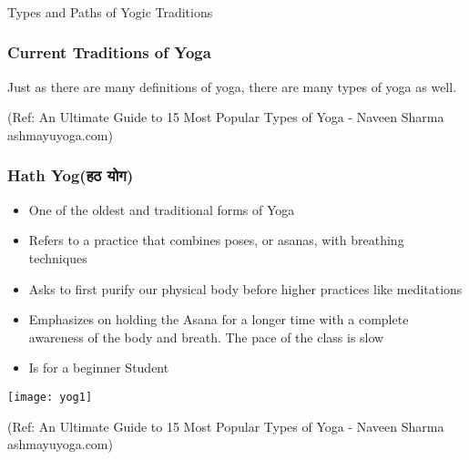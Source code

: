 \begin{frame}[fragile]\frametitle{}
\begin{center}
{\Large Types and Paths of Yogic Traditions}
\end{center}
\end{frame}


\begin{frame}[fragile]\frametitle{Current Traditions of Yoga}
Just as there are many definitions of yoga, there are many types of yoga as well. 

\tiny{(Ref: An Ultimate Guide to 15 Most Popular Types of Yoga - Naveen Sharma ashmayuyoga.com)}
\end{frame}

\begin{frame}[fragile]\frametitle{Hath Yog(हठ योग)}
	\begin{itemize}
	\item One of the oldest and traditional forms of Yoga
	\item Refers to a practice that combines poses, or asanas, with breathing techniques
	\item Asks to first purify our physical body before higher practices like meditations
	\item Emphasizes on holding the Asana for a longer time with a complete awareness of the body and breath. The pace of the class is slow
	\item Is for a beginner Student
	\end{itemize}

\begin{center}
\texttt{[image: yog1]}

\tiny{(Ref: An Ultimate Guide to 15 Most Popular Types of Yoga - Naveen Sharma ashmayuyoga.com)}
\end{center}

\end{frame}

